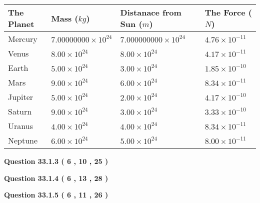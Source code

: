 \documentclass[12pt]{article}
\begin{document}
 
\begin{tabular}{|l|l|l|l|}
\hline
The Planet & Mass ($kg$) & Distanace from Sun ($m$) & The Force ($N$)\\
\hline
Mercury  &
           $ %
7.00000000 \times 10^{24} $   &
             $ %
7.000000000 \times 10^{24} $    & $ %
4.76 \times 10^{-11} $
\\  \hline
Venus    &
           $  %
8.00 \times 10^{24}  $     &
             $ %
8.00 \times 10^{24} $    & $ %
4.17 \times 10^{-11} $
\\  \hline
Earth    &
           $  %
5.00 \times 10^{24}  $     &
             $ %
3.00 \times 10^{24} $    & $ %
1.85 \times 10^{-10} $
\\   \hline
Mars     &
           $  %
9.00 \times 10^{24} $     &
             $ %
6.00 \times 10^{24} $    & $ %
8.34 \times 10^{-11} $
\\   \hline
Jupiter  &
           $  %
5.00 \times 10^{24} $    &
             $ %
2.00 \times 10^{24} $    & $ %
4.17 \times 10^{-10} $
\\  \hline
Saturn   &
           $  %
9.00 \times 10^{24} $    &
             $ %
3.00 \times 10^{24}  $    & $ %
3.33 \times 10^{-10} $
\\  \hline
Uranus   &
           $  %
4.00 \times 10^{24} $    &
             $ %
4.00 \times 10^{24} $    & $ %
8.34 \times 10^{-11} $
\\  \hline
Neptune  &
           $  %
6.00 \times 10^{24} $    &
             $ %
5.00 \times 10^{24} $    & $ %
8.00 \times 10^{-11} $
\\  \hline
 
\end{tabular}
 
 
 
 
  
\vspace{0.2in}
  
{\textbf{\Large{Question
33.1.3 
 (           6 ,          10 ,          25 )
}}}
  
  
  
\vspace{0.2in}
  
{\textbf{\Large{Question
33.1.4 
 (           6 ,          13 ,          28 )
}}}
  
  
  
\vspace{0.2in}
  
{\textbf{\Large{Question
33.1.5 
 (           6 ,          11 ,          26 )
}}}
  
\end{document}
